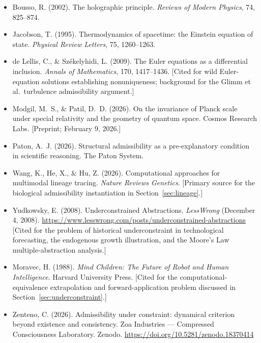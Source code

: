 \documentclass[12pt, a4paper]{article}
\theoremstyle{plain}
\theoremstyle{definition}
\theoremstyle{remark}
\begin{document}
\begin{itemize}[leftmargin=1.8em, itemsep=0.4em]
  \item Bousso, R. (2002). The holographic principle.
        \textit{Reviews of Modern Physics}, 74, 825--874.

  \item Jacobson, T. (1995). Thermodynamics of spacetime: the Einstein
        equation of state.
        \textit{Physical Review Letters}, 75, 1260--1263.

  \item de Lellis, C., \& Székelyhidi, L. (2009).
        The Euler equations as a differential inclusion.
        \textit{Annals of Mathematics}, 170, 1417--1436.
        [Cited for wild Euler-equation solutions establishing
        nonuniqueness; background for the Glimm et al.\ turbulence
        admissibility argument.]

  \item Modgil, M.~S., \& Patil, D.~D. (2026). On the invariance of
        Planck scale under special relativity and the geometry of
        quantum space. Cosmos Research Labs. [Preprint; February 9, 2026.]

  \item Paton, A.~J. (2026). Structural admissibility as a
        pre-explanatory condition in scientific reasoning.
        The Paton System.

  \item Wang, K., He, X., \& Hu, Z. (2026).
        Computational approaches for multimodal lineage tracing.
        \textit{Nature Reviews Genetics}.
        [Primary source for the biological admissibility instantiation
        in Section~\ref{sec:lineage}.]

  \item Yudkowsky, E. (2008). Underconstrained Abstractions.
        \textit{LessWrong} (December 4, 2008).
        \url{https://www.lesswrong.com/posts/underconstrained-abstractions}
        [Cited for the problem of historical underconstraint in technological
        forecasting, the endogenous growth illustration, and the Moore's Law
        multiple-abstraction analysis.]

  \item Moravec, H. (1988). \textit{Mind Children: The Future of Robot and Human
        Intelligence}. Harvard University Press.
        [Cited for the computational-equivalence extrapolation and forward-application
        problem discussed in Section~\ref{sec:underconstraint}.]

  \item Zenteno, C. (2026). Admissibility under constraint: dynamical
        criterion beyond existence and consistency.
        Zoa Industries --- Compressed Consciousness Laboratory.
        Zenodo. \url{https://doi.org/10.5281/zenodo.18370414}


\end{itemize}
\end{document}
